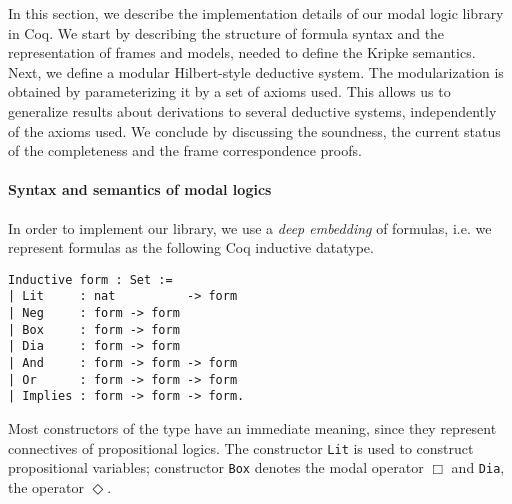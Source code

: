 \documentclass[sigconf,anonymous]{acmart}
\begin{document}
In this section, we describe the implementation details of our modal logic
library in Coq. We start by describing the structure of formula syntax and the
representation of frames and models, needed to define the Kripke semantics.
Next, we define a modular Hilbert-style deductive system. The modularization is
obtained by parameterizing it by a set of axioms used. This allows us to
generalize results about derivations to several deductive systems, independently
of the axioms used. We conclude by discussing the soundness, the current
status of the completeness and the frame correspondence proofs.

\paragraph{Syntax and semantics of modal logics}
In order to implement our library, we use a \emph{deep embedding} of
formulas, i.e. we represent formulas as the following Coq inductive datatype.
\begin{verbatim}
Inductive form : Set :=
| Lit     : nat          -> form
| Neg     : form -> form
| Box     : form -> form
| Dia     : form -> form
| And     : form -> form -> form
| Or      : form -> form -> form
| Implies : form -> form -> form.
\end{verbatim}
Most constructors of the type have an immediate meaning, since they represent
connectives of propositional logics. The constructor \texttt{Lit}
is used to construct propositional variables; constructor \texttt{Box}
denotes the modal operator $\Box$ and \texttt{Dia}, the operator
$\Diamond$.
\end{document}

